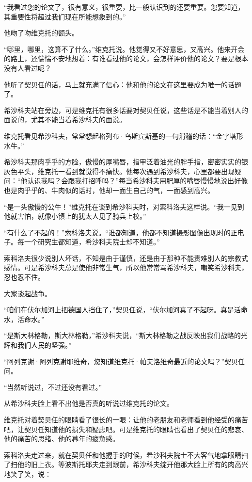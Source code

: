 “我看过您的论文了，很有意义，很重要，比一般认识到的还要重要。您要知道，其重要性将超过我们现在所能想象到的。”

他吻了吻维克托的额头。

“哪里，哪里，这算不了什么。”维克托说。他觉得又不好意思，又高兴。他来开会的路上，还惴惴不安地想着：有谁看过他的论文，会怎样评价他的论文？要是根本没有人看过呢？

他听了契贝任的话，马上就充满了信心：他和他的论文在这里要成为唯一的话题了。

希沙科夫站在旁边，可是维克托有很多话要对契贝任说，这些话是不能当着别人的面说的，尤其不能当着希沙科夫的面说。

维克托看见希沙科夫，常常想起格列布·乌斯宾斯基的一句滑稽的话：“金字塔形水牛。”

希沙科夫那肉乎乎的方脸，傲慢的厚嘴唇，指甲泛着油光的胖手指，密密实实的银灰色平头，维克托一看到就觉得不痛快。他每次遇到希沙科夫，心里都要出现疑问：“他认识我吗？会跟我打招呼吗？”每当希沙科夫用肥厚的嘴唇慢慢地说出好像也是肉乎乎的、牛肉似的话时，他却一面生自己的气，一面感到高兴。

“是一头傲慢的公牛！”维克托在谈到希沙科夫时，对索科洛夫这样说。“我一见到他就害怕，就像小镇上的犹太人见了骑兵上校。”

“有什么了不起的！”索科洛夫说。“谁都知道，他都不知道摄影图像出现时的正电子。每一个研究生都知道，希沙科夫院士却不知道。”

索科洛夫很少说别人坏话，不知是由于谨慎，还是由于那种不能责难别人的宗教式感情。可是希沙科夫总是使他非常生气，所以他常常骂希沙科夫，嘲笑希沙科夫，忍也忍不住。

大家谈起战争。

“咱们在伏尔加河上把德国人挡住了，”契贝任说，“伏尔加河真了不起呀。真是活命水，活命水。”

“是斯大林格勒，斯大林格勒，”希沙科夫说，“斯大林格勒之战反映出我们战略的光辉和我们人民的坚强。”

“阿列克谢·阿列克谢耶维奇，您知道维克托·帕夫洛维奇最近的论文吗？”契贝任问。

“当然听说过，不过还没有看过。”

从希沙科夫脸上看不出他是否真的听说过维克托的论文。

维克托对着契贝任的眼睛看了很长的一眼：让他的老朋友和老师看到他经受的痛苦吧，让契贝任知道他的损失和疑虑吧。可是维克托的眼睛也看出了契贝任的悲哀、他的痛苦的思绪、他的暮年的疲惫感。

索科洛夫走过来，就在契贝任和他握手的时候，希沙科夫院士不大客气地拿眼睛扫了扫他的旧上衣。等波斯托耶夫走到跟前，希沙科夫绽开他那大脸上所有的肉高兴地笑了笑，说：

